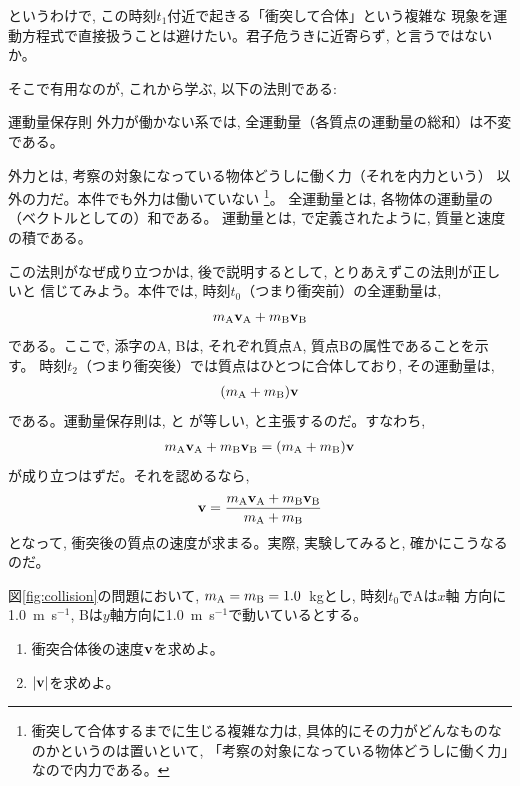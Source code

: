 というわけで, この時刻$t_1$付近で起きる「衝突して合体」という複雑な
現象を運動方程式で直接扱うことは避けたい。君子危うきに近寄らず, 
と言うではないか。\mv

そこで有用なのが, これから学ぶ, 以下の法則である:
\begin{itembox}{運動量保存則}
外力が働かない系では, 全運動量（各質点の運動量の総和）は不変である。
\end{itembox}
外力とは, 考察の対象になっている物体どうしに働く力（それを内力という）
以外の力だ。本件でも外力は働いていない
\footnote{衝突して合体するまでに生じる複雑な力は, 
具体的にその力がどんなものなのかというのは置いといて, 
「考察の対象になっている物体どうしに働く力」なので内力である。}。
全運動量とは, 各物体の運動量の（ベクトルとしての）和である。
運動量とは, で定義されたように, 質量と速度の積である。

この法則がなぜ成り立つかは, 後で説明するとして, とりあえずこの法則が正しいと
信じてみよう。本件では, 時刻$t_0$（つまり衝突前）の全運動量は, 
\begin{eqnarray} 
m_{\text A}{\bf v}_{\text A}+m_{\text B}{\bf v}_{\text B}\label{eq:momentum_mAmB_0}
\end{eqnarray} 
である。ここで, 添字のA, Bは, それぞれ質点A, 質点Bの属性であることを示す。
時刻$t_2$（つまり衝突後）では質点はひとつに合体しており, その運動量は, 
\begin{eqnarray} 
(m_{\text A}+m_{\text B}){\bf v}\label{eq:momentum_mAmB_1}
\end{eqnarray} 
である。運動量保存則は, と
が等しい, と主張するのだ。すなわち, 
\begin{eqnarray} 
m_{\text A}{\bf v}_{\text A}+m_{\text B}{\bf v}_{\text B}=(m_{\text A}+m_{\text B}){\bf v}
\end{eqnarray} 
が成り立つはずだ。それを認めるなら, 
\begin{eqnarray} 
{\bf v}=\frac{m_{\text A}{\bf v}_{\text A}+m_{\text B}{\bf v}_{\text B}}{m_{\text A}+m_{\text B}}\label{eq:2body_adhere}
\end{eqnarray} 
となって, 衝突後の質点の速度が求まる。実際, 実験してみると, 確かにこうなるのだ。\mv

%
\begin{q}\label{q:collision0}
図\ref{fig:collision}の問題において, $m_{\text A}=m_{\text B}=1.0$~kgとし, 時刻$t_0$でAは$x$軸
方向に1.0~m~s$^{-1}$, Bは$y$軸方向に1.0~m~s$^{-1}$で動いているとする。
\begin{enumerate}
\item 衝突合体後の速度${\bf v}$を求めよ。
\item $|{\bf v}|$を求めよ。
\end{enumerate}
\end{q}\mv

